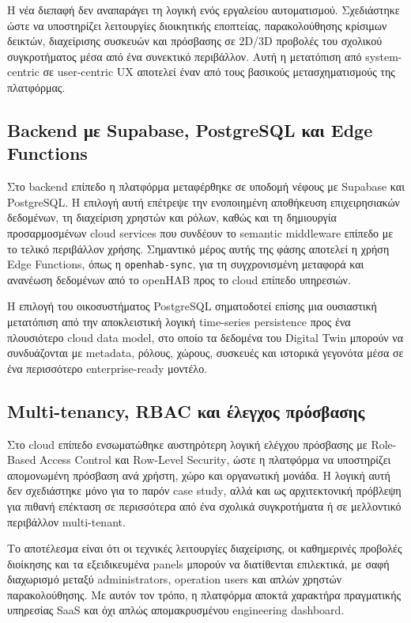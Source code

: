 Η νέα διεπαφή δεν αναπαράγει τη λογική ενός εργαλείου αυτοματισμού. Σχεδιάστηκε ώστε να υποστηρίζει λειτουργίες διοικητικής εποπτείας, παρακολούθησης κρίσιμων δεικτών, διαχείρισης συσκευών και πρόσβασης σε \textlatin{2D/3D} προβολές του σχολικού συγκροτήματος μέσα από ένα συνεκτικό περιβάλλον. Αυτή η μετατόπιση από \textlatin{system-centric} σε \textlatin{user-centric UX} αποτελεί έναν από τους βασικούς μετασχηματισμούς της πλατφόρμας.

\subsection{Backend με Supabase, PostgreSQL και Edge Functions}
Στο \textlatin{backend} επίπεδο η πλατφόρμα μεταφέρθηκε σε υποδομή νέφους με \textlatin{Supabase} και \textlatin{PostgreSQL}. Η επιλογή αυτή επέτρεψε την ενοποιημένη αποθήκευση επιχειρησιακών δεδομένων, τη διαχείριση χρηστών και ρόλων, καθώς και τη δημιουργία προσαρμοσμένων \textlatin{cloud services} που συνδέουν το \textlatin{semantic middleware} επίπεδο με το τελικό περιβάλλον χρήσης. Σημαντικό μέρος αυτής της φάσης αποτελεί η χρήση \textlatin{Edge Functions}, όπως η \texttt{openhab-sync}, για τη συγχρονισμένη μεταφορά και ανανέωση δεδομένων από το \textlatin{openHAB} προς το \textlatin{cloud} επίπεδο υπηρεσιών.

Η επιλογή του οικοσυστήματος \textlatin{PostgreSQL} σηματοδοτεί επίσης μια ουσιαστική μετατόπιση από την αποκλειστική λογική \textlatin{time-series persistence} προς ένα πλουσιότερο \textlatin{cloud data model}, στο οποίο τα δεδομένα του \textlatin{Digital Twin} μπορούν να συνδυάζονται με \textlatin{metadata}, ρόλους, χώρους, συσκευές και ιστορικά γεγονότα μέσα σε ένα περισσότερο \textlatin{enterprise-ready} μοντέλο.

\subsection{Multi-tenancy, RBAC και έλεγχος πρόσβασης}
Στο \textlatin{cloud} επίπεδο ενσωματώθηκε αυστηρότερη λογική ελέγχου πρόσβασης με \textlatin{Role-Based Access Control} και \textlatin{Row-Level Security}, ώστε η πλατφόρμα να υποστηρίζει απομονωμένη πρόσβαση ανά χρήστη, χώρο και οργανωτική μονάδα. Η λογική αυτή δεν σχεδιάστηκε μόνο για το παρόν \textlatin{case study}, αλλά και ως αρχιτεκτονική πρόβλεψη για πιθανή επέκταση σε περισσότερα από ένα σχολικά συγκροτήματα ή σε μελλοντικό περιβάλλον \textlatin{multi-tenant}.

Το αποτέλεσμα είναι ότι οι τεχνικές λειτουργίες διαχείρισης, οι καθημερινές προβολές διοίκησης και τα εξειδικευμένα \textlatin{panels} μπορούν να διατίθενται επιλεκτικά, με σαφή διαχωρισμό μεταξύ \textlatin{administrators}, \textlatin{operation users} και απλών χρηστών παρακολούθησης. Με αυτόν τον τρόπο, η πλατφόρμα αποκτά χαρακτήρα πραγματικής υπηρεσίας \textlatin{SaaS} και όχι απλώς απομακρυσμένου \textlatin{engineering dashboard}.

